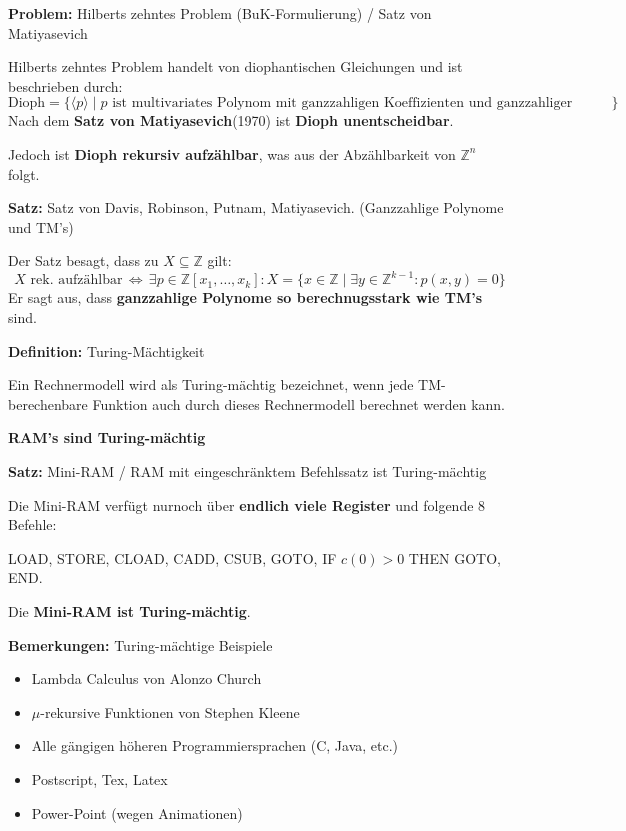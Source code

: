 \documentclass[a4paper,graphics,11pt]{article}
\newcommand{\godel}[1]{\langle #1 \rangle}
\newcommand{\Iff}[0]{\,\Longleftrightarrow\,}
\begin{document}
\strut

\textbf{Problem:} Hilberts zehntes Problem (BuK-Formulierung) / Satz von Matiyasevich

Hilberts zehntes Problem handelt von diophantischen Gleichungen und ist beschrieben durch:
$$
    \text{Dioph} =  \{\godel{p} \mid p \text{ ist multivariates Polynom mit ganzzahligen Koeffizienten und ganzzahliger Nullstelle}\}
$$
Nach dem \textbf{Satz von Matiyasevich}(1970) ist \textbf{Dioph unentscheidbar}.

Jedoch ist \textbf{Dioph rekursiv aufzählbar}, was aus der Abzählbarkeit von $\mathbb{Z}^n$ folgt.

\strut

\textbf{Satz:} Satz von Davis, Robinson, Putnam, Matiyasevich. (Ganzzahlige Polynome und TM's)

Der Satz besagt, dass zu $X\subseteq \mathbb{Z}$ gilt:
$$
    X \text{ rek. aufzählbar} \Iff
    \exists p \in \mathbb{Z}[x_1,\dots,x_k] : X = \{x \in \mathbb{Z} \mid \exists y \in \mathbb{Z}^{k-1}: p(x,y) = 0\}
$$
Er sagt aus, dass \textbf{ganzzahlige Polynome so berechnugsstark wie TM's} sind.

\strut

\textbf{Definition:} Turing-Mächtigkeit

Ein Rechnermodell wird als Turing-mächtig bezeichnet, wenn jede TM-berechenbare Funktion
auch durch dieses Rechnermodell berechnet werden kann.

\textbf{RAM's sind Turing-mächtig}

\strut

\textbf{Satz:} Mini-RAM / RAM mit eingeschränktem Befehlssatz ist Turing-mächtig

Die Mini-RAM verfügt nurnoch über \textbf{endlich viele Register} und folgende 8 Befehle:

LOAD, STORE, CLOAD, CADD, CSUB, GOTO, IF $c(0) > 0$ THEN GOTO, END.

Die \textbf{Mini-RAM ist Turing-mächtig}.

\newpage

\textbf{Bemerkungen:} Turing-mächtige Beispiele
\begin{itemize}
    \item Lambda Calculus von Alonzo Church
    \item $\mu$-rekursive Funktionen von Stephen Kleene
    \item Alle gängigen höheren Programmiersprachen (C, Java, etc.)
    \item Postscript, Tex, Latex
    \item Power-Point (wegen Animationen)
\end{itemize}
\end{document}
